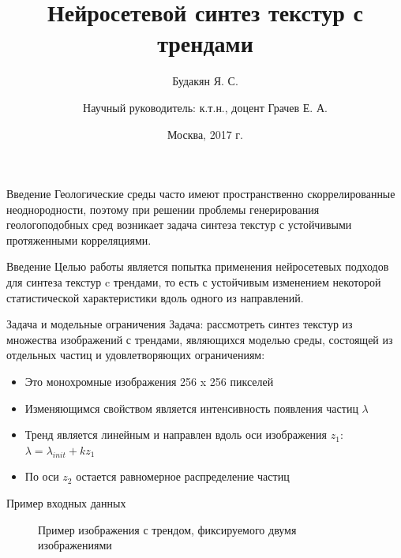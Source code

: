\documentclass[12pt]{beamer}
\begin{document}
	\title{Нейросетевой синтез текстур с трендами}
	\author{Будакян Я. С. \and \break \break Научный руководитель: к.т.н., доцент Грачев Е. А.}
	\date{Москва, 2017 г.} 

	\maketitle

	\begin{frame}{Введение}
		Геологические среды часто имеют пространственно скоррелированные неоднородности, поэтому при решении проблемы генерирования геологоподобных сред возникает задача синтеза текстур с устойчивыми протяженными корреляциями.
	\end{frame}
	
	\begin{frame}{Введение}
		Целью работы является попытка применения нейросетевых подходов для синтеза текстур c трендами, то есть с устойчивым изменением некоторой статистической характеристики вдоль одного из направлений.
	\end{frame}
	
	\begin{frame}{Задача и модельные ограничения}
		Задача: рассмотреть синтез текстур из множества изображений с трендами, являющихся моделью среды, состоящей из отдельных частиц и удовлетворяющих ограничениям:
		
		\begin{itemize}
			\item Это монохромные изображения 256 x 256 пикселей
			\item Изменяющимся свойством является интенсивность появления частиц $\lambda$
			\item Тренд является линейным и направлен вдоль оси изображения $z_1$: 
			$ \lambda = \lambda_{init} + k z_1 $
			\item По оси $z_2$ остается равномерное распределение частиц
		\end{itemize}
	\end{frame}
	
	\begin{frame}{Пример входных данных}
		\begin{figure}[h]
			\vfill
			Пример изображения с трендом, фиксируемого двумя изображениями
		\end{figure}
	\end{frame}
	
\end{document}
